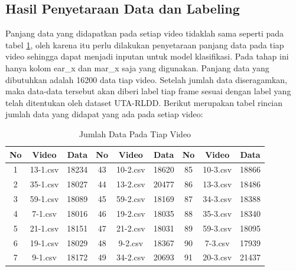 \subsection{Hasil Penyetaraan Data dan Labeling}
Panjang data yang didapatkan pada setiap video tidaklah sama seperti pada tabel \ref{tb:JumlahData}, oleh karena itu
perlu dilakukan penyetaraan panjang data pada tiap video sehingga dapat menjadi
inputan untuk model klasifikasi. Pada tahap ini hanya kolom ear\_x dan mar\_x
saja yang digunakan. Panjang data yang dibutuhkan adalah 16200 data tiap video.
Setelah jumlah data diseragamkan, maka data-data tersebut akan diberi label tiap
frame sesuai dengan label yang telah ditentukan oleh dataset UTA-RLDD. Berikut
merupakan tabel rincian jumlah data yang didapat yang ada pada setiap video:

\begin{longtable}{|c|c|c|c|c|c|c|c|c|}
  \caption{Jumlah Data Pada Tiap Video}
  \label{tb:JumlahData}                                                                                                                      \\
  \hline
  \rowcolor[HTML]{C0C0C0}
  \textbf{No} & \textbf{Video} & \textbf{Data} & \textbf{No} & \textbf{Video} & \textbf{Data} & \textbf{No} & \textbf{Video} & \textbf{Data} \\
  \hline
  1           & 13-1.csv       & 18234         & 43          & 10-2.csv       & 18620         & 85          & 10-3.csv       & 18866         \\
  2           & 35-1.csv       & 18027         & 44          & 13-2.csv       & 20477         & 86          & 13-3.csv       & 18486         \\
  3           & 59-1.csv       & 18089         & 45          & 59-2.csv       & 18169         & 87          & 34-3.csv       & 18388         \\
  4           & 7-1.csv        & 18016         & 46          & 19-2.csv       & 18035         & 88          & 35-3.csv       & 18340         \\
  5           & 21-1.csv       & 18151         & 47          & 21-2.csv       & 18031         & 89          & 59-3.csv       & 18095         \\
  6           & 19-1.csv       & 18029         & 48          & 9-2.csv        & 18367         & 90          & 7-3.csv        & 17939         \\
  7           & 9-1.csv        & 18172         & 49          & 34-2.csv       & 20693         & 91          & 20-3.csv       & 21437         \\

\end{longtable}
